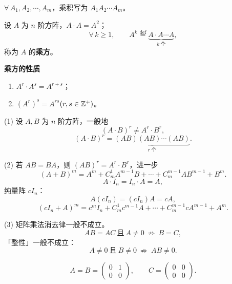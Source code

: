 $\forall\,A_1,A_2,\cdots,A_m$，乘积写为 $A_1A_2\cdots A_m$。

\begin{definition}[方阵的乘方]%
设 $A$ 为 $n$ 阶方阵，$A\cdot A=A^2$；
\[
\forall\,k\ge 1,\qquad A^{k}\overset{\text{def}}{=}\underbrace{A\cdot A\cdots A}_{k\ \text{个}},
\]
称为 $A$ 的\textbf{乘方}。
\end{definition}


\textbf{乘方的性质}
\begin{enumerate}[label=(\arabic*)]
\item $A^{r}\cdot A^{s}=A^{r+s}$；
\item $(A^{r})^{s}=A^{rs}$\qquad$(r,s\in\mathbb{Z}^{+})$。
\end{enumerate}

\begin{remark}%
(1) 设 $A,B$ 为 $n$ 阶方阵，一般地
\[
(A\cdot B)^{r}\ne A^{r}\cdot B^{r},
\]
\[
(A\cdot B)^{r}=\underbrace{(AB)(AB)\cdots(AB)}_{r\ \text{个}}.
\]

(2) 若 $AB=BA$，则 $(AB)^{r}=A^{r}\cdot B^{r}$，进一步
\[
(A+B)^{m}=A^{m}+C_m^1A^{m-1}B+\cdots+C_m^{m-1}AB^{m-1}+B^{m}.
\]
\[
A\cdot I_n=I_n\cdot A=A,
\]
纯量阵 $cI_n$：
\[
A(cI_n)=(cI_n)A=cA,
\]
\[
(cI_n+A)^{m}=c^{m}I_n+C_m^1c^{m-1}A+\cdots+C_m^{m-1}cA^{m-1}+A^{m}.
\]

(3) 矩阵乘法消去律一般不成立。
\[
AB=AC\ \text{且}\ A\ne 0\ \not\Rightarrow\ B=C,
\]
「整性」一般不成立：
\[
A\ne 0\ \text{且}\ B\ne 0\ \not\Rightarrow\ AB\ne 0.
\]
\end{remark}

\begin{example}
\[
A=B=\begin{pmatrix}0 & 1\\0 & 0\end{pmatrix},\qquad
C=\begin{pmatrix}0 & 0\\0 & 0\end{pmatrix}.
\]
\end{example}

